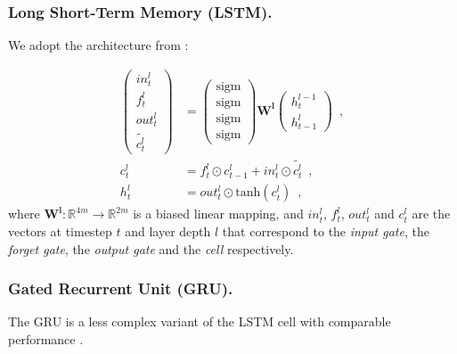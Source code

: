\documentclass[preprint,5p]{elsarticle}
\begin{document}
\subsubsection{Long Short-Term Memory (LSTM).}
We adopt the architecture from \cite{Zaremba2014}:

\begin{align} 
  \left (
    \begin{array}{l}
      in_t^l \\
      f_t^l \\
      out_t^l \\
      \widetilde{c_t^l}
    \end{array}
  \right ) & = \left (
    \begin{array}{l}
      \text{sigm} \\
      \text{sigm} \\
      \text{sigm} \\
      \text{sigm}
    \end{array}
  \right ) \mathbf{W^l} \left (
    \begin{array}{l}
      h_{t}^{l-1}\\
      h_{t-1}^{l}
    \end{array}
  \right ) \enspace,\\
  c_t^l & = f_t^l \odot c_{t-1}^l + in_t^l \odot \widetilde{c_t^l} \enspace,\\
  h_t^l & = out_t^l \odot \text{tanh}(c_t^l)\enspace,
\end{align}where $\mathbf{W^l}:\mathbb{R}^{4m} \rightarrow \mathbb{R}^{2m}$ is a biased linear mapping, and $in_t^l$, $f_t^l$, $out_t^l$ and $c_t^l$ are the vectors at timestep $t$ and layer depth $l$ that correspond to the \textit{input gate}, the \textit{forget gate}, the \textit{output gate} and the \textit{cell} respectively.





\subsubsection{Gated Recurrent Unit (GRU).}
The GRU is a less complex variant of the LSTM cell \cite{Cho2014} with comparable performance \cite{Chung2014}.
\end{document}
